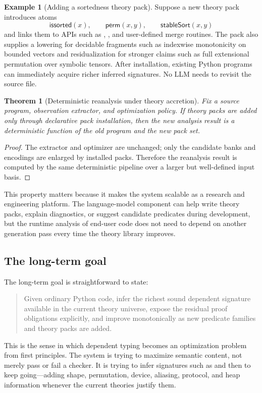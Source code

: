 \documentclass[11pt]{article}
\newcommand{\py}[1]{\texttt{\detokenize{#1}}}
\theoremstyle{definition}
\newtheorem{example}[definition]{Example}
\theoremstyle{plain}
\newtheorem{theorem}[definition]{Theorem}
\begin{document}
\begin{example}[Adding a sortedness theory pack]
Suppose a new theory pack introduces atoms
\[
\mathsf{issorted}(x), \qquad \mathsf{perm}(x,y), \qquad \mathsf{stableSort}(x,y)
\]
and links them to APIs such as \py{torch.sort}, \py{sorted}, and user-defined
merge routines. The pack also supplies a lowering for decidable fragments such as
indexwise monotonicity on bounded vectors and residualization for stronger claims
such as full extensional permutation over symbolic tensors. After installation,
existing Python programs can immediately acquire richer inferred signatures. No
LLM needs to revisit the source file.
\end{example}

\begin{theorem}[Deterministic reanalysis under theory accretion]
Fix a source program, observation extractor, and optimization policy. If theory
packs are added only through declarative pack installation, then the new analysis
result is a deterministic function of the old program and the new pack set.
\end{theorem}

\begin{proof}
The extractor and optimizer are unchanged; only the candidate banks and
encodings are enlarged by installed packs. Therefore the reanalysis result is
computed by the same deterministic pipeline over a larger but well-defined input
basis.
\end{proof}

This property matters because it makes the system scalable as a research and
engineering platform. The language-model component can help write theory packs,
explain diagnostics, or suggest candidate predicates during development, but the
runtime analysis of end-user code does not need to depend on another generation
pass every time the theory library improves.

\subsection{The long-term goal}
The long-term goal is straightforward to state:
\begin{quote}
Given ordinary Python code, infer the richest sound dependent signature available
in the current theory universe, expose the residual proof obligations explicitly,
and improve monotonically as new predicate families and theory packs are added.
\end{quote}
This is the sense in which dependent typing becomes an optimization problem from
first principles. The system is trying to maximize semantic content, not merely
pass or fail a checker. It is trying to infer signatures such as
\py{a : Tensor | issorted(a)} and then to keep going---adding shape, permutation,
device, aliasing, protocol, and heap information whenever the current theories
justify them.
\end{document}
